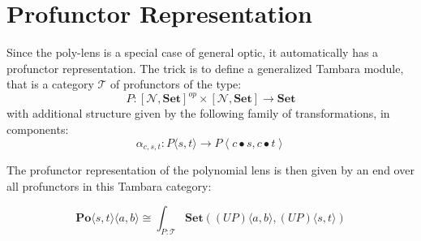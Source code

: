 \documentclass[11pt]{amsart}
\begin{document}
\section{Profunctor Representation}

Since the poly-lens is a special case of general optic, it automatically has a profunctor representation. The trick is to define a generalized Tambara module, that is a category $\mathcal{T}$ of profunctors of the type:
\[ P \colon [\mathcal{N}, \mathbf{Set}]^{op}  \times [\mathcal{N}, \mathbf{Set}] \to \mathbf{Set} \]
with additional structure given by the following family of transformations, in components:
\[\alpha_{c, s, t} \colon P\langle s, t \rangle \to P \left \langle c \bullet s, c \bullet t \right \rangle \]

The profunctor representation of the polynomial lens is then given by an end over all profunctors in this Tambara category:

\[  \mathbf{Po}\langle s, t\rangle \langle a, b\rangle \cong \int_{P \colon \mathcal{T}} \mathbf{Set}\left ( (U P)\langle a, b \rangle, (U P) \langle s, t \rangle \right) \]
        
\end{document}
